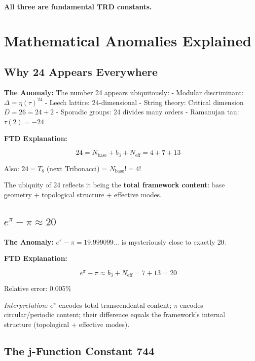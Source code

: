 \documentclass[
  11pt,
  letterpaper,
  twoside,
  openright]{book}
\begin{document}
\textbf{All three are fundamental TRD constants.}

\section{Mathematical Anomalies
Explained}\label{mathematical-anomalies-explained}

\subsection{Why 24 Appears Everywhere}\label{why-24-appears-everywhere}

\textbf{The Anomaly:} The number 24 appears ubiquitously: - Modular
discriminant: \(\Delta = \eta(\tau)^{24}\) - Leech lattice:
24-dimensional - String theory: Critical dimension \(D = 26 = 24 + 2\) -
Sporadic groups: 24 divides many orders - Ramanujan tau:
\(\tau(2) = -24\)

\textbf{FTD Explanation:}

\[24 = N_{\text{base}} + b_3 + N_{\text{eff}} = 4 + 7 + 13\]

Also: \(24 = T_8\) (next Tribonacci) = \(N_{\text{base}}! = 4!\)

The ubiquity of 24 reflects it being the \textbf{total framework
content}: base geometry + topological structure + effective modes.

\subsection{\texorpdfstring{\(e^\pi - \pi \approx 20\)}{e\^{}\textbackslash pi - \textbackslash pi \textbackslash approx 20}}\label{epi---pi-approx-20}

\textbf{The Anomaly:} \(e^\pi - \pi = 19.999099...\) is mysteriously
close to exactly 20.

\textbf{FTD Explanation:}

\[e^\pi - \pi \approx b_3 + N_{\text{eff}} = 7 + 13 = 20\]

Relative error: 0.005\%

\emph{Interpretation:} \(e^\pi\) encodes total transcendental content;
\(\pi\) encodes circular/periodic content; their difference equals the
framework's internal structure (topological + effective modes).

\subsection{The j-Function Constant
744}\label{the-j-function-constant-744}
\end{document}
